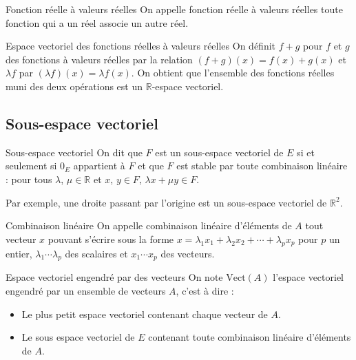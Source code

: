 \documentclass{classe}
\begin{document}
\begin{définition}{Fonction réelle à valeurs réelles}{}
On appelle fonction réelle à valeurs réelles toute fonction qui a un réel associe un autre réel.
\end{définition}

\begin{théorème}{Espace vectoriel des fonctions réelles à valeurs réelles}{}
On définit $f+g$ pour $f$ et $g$ des fonctions à valeurs réelles par la relation $(f+g)(x) = f(x)+g(x)$ et $\lambda f$ par $(\lambda f)(x) = \lambda f(x)$. On obtient que l'ensemble des fonctions réelles muni des deux opérations est un $\mathbb{R}$-espace vectoriel.
\end{théorème}

\subsection{Sous-espace vectoriel}

\begin{définition}{Sous-espace vectoriel}{}
	On dit que $F$ est un sous-espace vectoriel de $E$ si et seulement si $0_E$ appartient à $F$ et que $F$ est stable par toute combinaison linéaire : pour tous $\lambda$, $\mu \in \mathbb{R}$ et $x$, $y\in F$, $\lambda x + \mu y \in F$.
\end{définition}

\begin{example}{}
	Par exemple, une droite passant par l'origine est un sous-espace vectoriel de $\mathbb{R}^2$.
\end{example}

\begin{définition}{Combinaison linéaire}{}
On appelle combinaison linéaire d'éléments de $A$ tout vecteur $x$ pouvant s'écrire sous la forme $x = \lambda_1 x_1 + \lambda_2 x_2 + \cdots + \lambda_p x_p$ pour $p$ un entier, $\lambda_1 \cdots \lambda_p$ des scalaires et $x_1 \cdots x_p$ des vecteurs.
\end{définition}

\begin{définition}{Espace vectoriel engendré par des vecteurs}{}
On note $\mathrm{Vect}(A)$ l'espace vectoriel engendré par un ensemble de vecteurs $A$, c'est à dire :
\begin{itemize}
\item Le plus petit espace vectoriel contenant chaque vecteur de $A$.
\item Le sous espace vectoriel de $E$ contenant toute combinaison linéaire d'éléments de $A$.
\end{itemize}
\end{définition}
\end{document}
